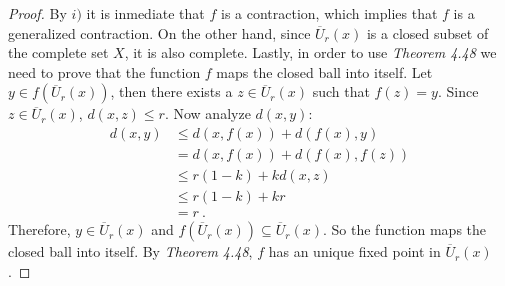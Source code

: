 \begin{questions}


\begin{solution}
  \begin{proof}
  By $i)$ it is inmediate that $f$ is a contraction, which implies that $f$ is a generalized contraction. On the other hand, since $\overline{U}_r(x)$ is a closed subset of the complete set $X$, it is also complete. Lastly, in order to use \textit{Theorem 4.48} we need to prove that the function $f$ maps the closed ball into itself.
Let $y\in f(\overline{U}_r(x))$, then there exists a $z\in \overline{U}_r(x)$ such that $f(z)=y$. Since $z\in \overline{U}_r(x)$, $d(x,z)\leq r$. Now analyze $d(x,y)$:
\begin{align*}
d(x,y)&\leq d(x,f(x))+d(f(x),y)\\
&=d(x,f(x))+d(f(x),f(z))\\
&\leq r(1-k)+kd(x,z)\\
&\leq r(1-k)+kr\\
&=r~.
\end{align*}
Therefore, $y\in \overline{U}_r(x)$ and $f(\overline{U}_r(x))\subseteq\overline{U}_r(x)$. So the function maps the closed ball into itself. By \textit{Theorem 4.48}, $f$ has an unique fixed point in $\overline{U}_r(x)$.
  \end{proof}
\end{solution}


\end{questions}